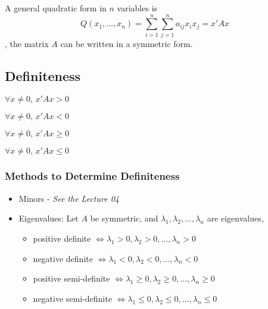 \begin{definition}
    A general quadratic form in $n$ variables is \begin{equation*}
        Q(x_{1},\dots,x_{n}) = \sum_{i=1}^{n}\sum_{j=1}^{n} a_{ij}x_ix_j = x'Ax
    \end{equation*}
    , the matrix $A$ can be written in a symmetric form.
\end{definition}

\subsection{Definiteness}

\begin{definition}
    $\forall x \neq 0, \,x'Ax > 0$
\end{definition}

\begin{definition}
    $\forall x \neq 0, \,x'Ax < 0$
\end{definition}

\begin{definition}
    $\forall x \neq 0, \,x'Ax \geq 0$
\end{definition}

\begin{definition}
    $\forall x \neq 0, \,x'Ax \leq 0$
\end{definition}

\subsubsection{Methods to Determine Definiteness}
\begin{itemize}
    \item Minors - \emph{See the Lecture 04}
    \item Eigenvalues: Let $A$ be symmetric, and $\lambda_{1}, \lambda_{2}, \dots, \lambda_{n}$ are eigenvalues,
          \begin{itemize}
              \item positive definite $\iff \lambda_{1} > 0, \lambda_{2}>0, \dots, \lambda_{n}>0$
              \item negative definite $\iff \lambda_{1} < 0, \lambda_{2}<0, \dots, \lambda_{n}<0$
              \item positive semi-definite $\iff \lambda_{1} \geq 0, \lambda_{2} \geq 0, \dots, \lambda_{n}\geq 0$
              \item negative semi-definite $\iff \lambda_{1} \leq 0, \lambda_{2}\leq 0, \dots, \lambda_{n}\leq 0$
          \end{itemize}
\end{itemize}

